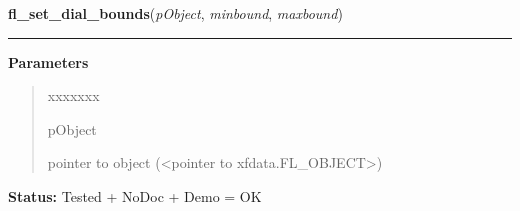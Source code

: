 \hspace{.8\funcindent}\begin{boxedminipage}{\funcwidth}

    \raggedright \textbf{fl\_set\_dial\_bounds}(\textit{pObject}, \textit{minbound}, \textit{maxbound})

    \vspace{-1.5ex}

    \rule{\textwidth}{0.5\fboxrule}
\setlength{\parskip}{2ex}
\setlength{\parskip}{1ex}
      \textbf{Parameters}
      \vspace{-1ex}

      \begin{quote}
        \begin{Ventry}{xxxxxxx}

          \item[pObject]

          pointer to object ({\textless}pointer to 
          xfdata.FL\_OBJECT{\textgreater})

        \end{Ventry}

      \end{quote}

\textbf{Status:} Tested + NoDoc + Demo = OK



    \end{boxedminipage}

    \label{xformslib:library:fl_get_dial_bounds}

    \vspace{0.5ex}

